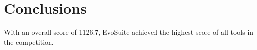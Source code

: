 \documentclass[10pt,conference]{IEEEtran}
\newcommand{\EVOSUITE}{{\sc EvoSuite}\xspace}
\begin{document}




\section{Conclusions}

With an overall score of 1126.7, \EVOSUITE achieved the highest score
of all tools in the competition. 
\end{document}
